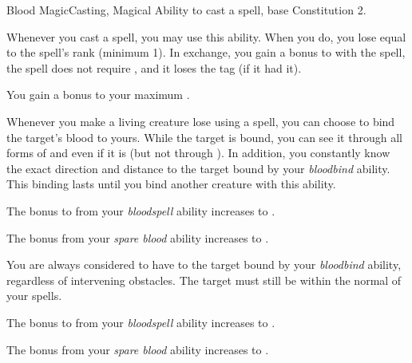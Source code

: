     \begin{feat}{Blood Magic}{Casting, Magical}
        \featpre Ability to cast a spell, base Constitution 2.

         Whenever you cast a spell, you may use this ability.
        When you do, you lose  equal to the spell's rank (minimum 1).
        In exchange, you gain a  bonus to  with the spell, the spell does not require , and it loses the  tag (if it had it).

         You gain a  bonus to your maximum .

         Whenever you make a living creature lose  using a spell, you can choose to bind the target's blood to yours.
        While the target is bound, you can see it through all forms of  and even if it is  (but not through ).
        In addition, you constantly know the exact direction and distance to the target bound by your \textit{bloodbind} ability.
        This binding lasts until you bind another creature with this ability.

         The bonus to  from your \textit{bloodspell} ability increases to .

         The bonus from your \textit{spare blood} ability increases to .

         You are always considered to have  to the target bound by your \textit{bloodbind} ability, regardless of intervening obstacles.
        The target must still be within the normal  of your spells.

         The bonus to  from your \textit{bloodspell} ability increases to .

         The bonus from your \textit{spare blood} ability increases to .
    \end{feat}

